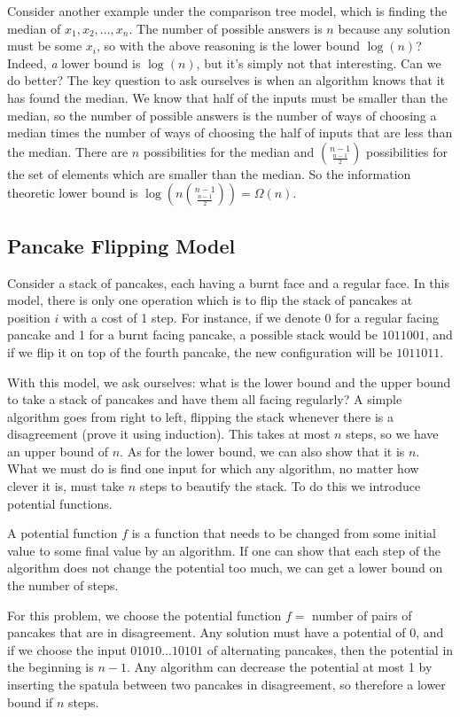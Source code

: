 Consider another example under the comparison tree model, which is
finding the median of $x_1, x_2, ..., x_n$. The number of possible
answers is $n$ because any solution must be some $x_i$, so with
the above reasoning is the lower bound $\log(n)$? Indeed, \emph{a}
lower bound is $\log(n)$, but it's simply not that interesting.
Can we do better? The key question to ask ourselves is when an
algorithm knows that it has found the median. We know that half of the
inputs must be smaller than the median, so the number of possible answers is the number of ways of choosing a median times the number of ways of choosing the half of inputs that are less than the median.
There are $n$ possibilities for the median and 
$\binom{n - 1}{\frac{n-1}{2}}$ possibilities for the set of elements
which are smaller than the median. So the information theoretic
lower bound is $\log(n\binom{n - 1}{\frac{n-1}{2}}) = \Omega(n)$.

\subsection{Pancake Flipping Model}

Consider a stack of pancakes, each having a burnt face and a regular face. In this model, there is only one operation which is to flip
the stack of pancakes at position $i$ with a cost of 1 step.
For instance, if we denote 0 for a regular facing pancake and 1
for a burnt facing pancake, a possible stack would be
$1011001$, and if we flip it on top of the fourth pancake, the
new configuration will be $1011011$.

With this model, we ask ourselves: what is the lower bound and
the upper bound to take a stack of pancakes and have them all facing regularly? A simple algorithm goes from right to left, flipping
the stack whenever there is a disagreement (prove it using
induction). This takes at most $n$ steps, so we have an upper bound
of $n$. As for the lower bound, we can also show that it is $n$.
What we must do is find one input for which any algorithm, no matter how clever it is, must take $n$ steps to beautify the stack. To
do this we introduce potential functions.

\begin{definition}
    A potential function $f$ is a function that needs to be changed from some initial value to some final value by an algorithm. If one can show that each step of the algorithm does not change the
    potential too much, we can get a lower bound on the number of steps.
\end{definition}

For this problem, we choose the potential function $f = $ number of pairs of pancakes that are in disagreement. Any solution must
have a potential of 0, and if we choose the input $01010...10101$
of alternating pancakes, then the potential in the beginning is $n - 1$. Any algorithm can decrease the potential at most 1 by inserting
the spatula between two pancakes in disagreement, so therefore
a lower bound if $n$ steps.






